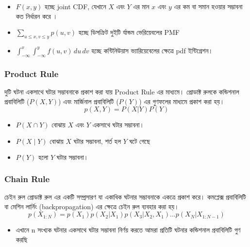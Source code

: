 \documentclass[graybox, envcountchap, twocolumn]{styles/svmult}
\begin{document}
\begin{itemize}
    \item $F(x, y)$ { \bengalifont হচ্ছে joint CDF, {\bengalifont যেখানে  $X$ এবং $Y$ এর মান $x$ এবং $y$ এর কম বা সমান হওয়ার সম্ভাবনা কত নির্ধারন করে ।}}
    \item $\sum_{u \leq x, v \leq y} p(u, v)$ {\bengalifont হচ্ছে ডিসক্রিট দুইটি র্যান্ডম ভেরিয়েবলের PMF}
    \item $\int_{-\infty}^{x} \int_{-\infty}^{y} f(u, v) \, du \, dv$ {\bengalifont হচ্ছে কন্টিনিউয়াস ভ্যারিয়েবেলের ক্ষেত্রে pdf ইন্টিগ্রেশন।}
\end{itemize}

\subsubsection{Product Rule}

 {\bengalifont দুটি ঘটনা একসাথে ঘটার সম্ভাবনাকে প্রকাশ করা যায় Product Rule এর মাধ্যমে।  প্রোডাক্ট রুলকে কন্ডিশনাল প্রবাবিলিটি ($P(X,Y)$) এবং মার্জিনাল প্রবাবিলিটি ($P(Y)$) এর গুণফলের মাধ্যমে প্রকাশ করা হয়।   }
\begin{equation}\label{eqn:product-rule}
p(X,Y) = P(X|Y) P(Y)
\end{equation}
\begin{itemize} 
    \item $P(X \cap Y)$ {\bengalifont বোঝায় $X$ এবং $Y$ একসাথে ঘটার সম্ভাবনা।} 
    \item $P(X \mid Y)$ {\bengalifont বোঝায় $X$ ঘটার সম্ভাবনা, শর্ত হল $Y$  ঘটে গেছে } 
    \item $P(Y)$ {\bengalifont হলো $Y$ ঘটার সম্ভাবনা।} \end{itemize}


\subsubsection{Chain Rule}
{\bengalifont চেইন রুল প্রোডাক্ট রুল এর একটি সম্প্রসারণ যা একাধিক ঘটনার সম্ভাবনাকে একত্রে প্রকাশ করে। কমপ্লেক্স প্রবাবিলিটি বা মেশিন লার্নিং (backpropagation) এর ক্ষেত্রে চেইন রুল ব্যবহার করা হয়। }
\begin{equation}
p(X_{1:N}) = p(X_1)p(X_2|X_1)p(X_3|X_2,X_1)...p(X_N|X_{1:N-1})
\label{eq:1}
\end{equation}

\begin{itemize}
    \item {\bengalifont এখানে 
    n সংখ্যক ঘটনার একসাথে ঘটার সম্ভাবনা নির্ণয় করতে আমরা প্রতিটি ঘটনার কন্ডিশনাল প্রবাবিলিটি গুণ করছি }
\end{itemize}
\end{document}
